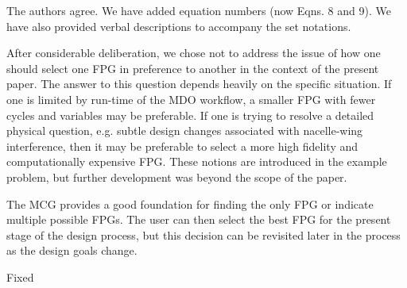 \documentclass{aiaa-tc}
\begin{document}

The authors agree.  We have added equation numbers (now Eqns. 8 and 9). We have also provided verbal descriptions to accompany the set notations. 



After considerable deliberation, we chose not to address the issue of how one should select one FPG in preference to another  in the context of the present paper. The answer 
to this question depends heavily on the specific situation. If one is limited by run-time of the MDO workflow, 
a smaller FPG with fewer cycles and variables may be preferable. If one is trying to resolve a detailed physical question, e.g. subtle design changes associated with nacelle-wing interference, then it may be preferable  to select a
more high fidelity and computationally expensive FPG. These notions are introduced in the example problem, but further development was beyond the scope of the paper.

The MCG provides a good foundation for finding the only FPG or indicate multiple possible FPGs. The user can then select the best FPG for the present stage of the design process, but this decision can  be revisited later in the process as the design goals change.


Fixed 
\end{document}
